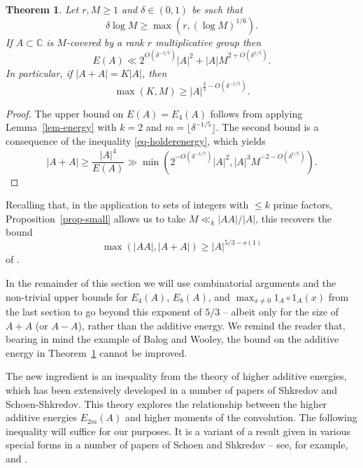\documentclass{amsart}
\renewcommand{\leq}{\leqslant}
\renewcommand{\geq}{\geqslant}
\newcommand{\bbc}{\mathbb{C}}
\newcommand{\abs}[1]{\left\lvert #1\right\rvert}
\newcommand{\brac}[1]{\left( #1\right)}
\newtheorem{theorem}{Theorem}
\theoremstyle{definition}
\begin{document}
\begin{theorem}\label{th-olden}
Let $r,M\geq 1$ and $\delta\in (0,1)$ be such that
\[\delta \log M \geq \max(r, (\log M)^{1/6}).\]
If $A\subset \bbc$ is $M$-covered by a rank $r$ multiplicative group then
\[E(A)\ll 2^{O(\delta^{-1/5})}\abs{A}^2+\abs{A}M^{2+O(\delta^{1/5})}.\]
In particular, if $\abs{A+A}=K\abs{A}$, then
\[\max(K,M)\geq \abs{A}^{\frac{2}{3}-O(\delta^{-1/5})}.\]
\end{theorem}
\begin{proof}
The upper bound on $E(A)=E_4(A)$ follows from applying Lemma~\ref{lem-energy} with $k=2$ and $m=\lfloor \delta^{-1/5}\rfloor$. The second bound is a consequence of the inequality \eqref{eq-holderenergy}, which yields
\[\abs{A+A}\geq \frac{\abs{A}^4}{E(A)}\gg \min\brac{  2^{-O(\delta^{-1/5})}\abs{A}^2, \abs{A}^{3}M^{-2-O(\delta^{1/5})}}.\]
\end{proof}

Recalling that, in the application to sets of integers with $\leq k$ prime factors, Proposition~\ref{prop-small} allows us to take $M\ll_k \abs{AA}/\abs{A}$, this recovers the bound
\[\max(\abs{AA},\abs{A+A})\geq \abs{A}^{5/3-o(1)}\]
of \cite{HRSZ25}.

In the remainder of this section we will use combinatorial arguments and the non-trivial upper bounds for $E_4(A)$, $E_8(A)$, and $\max_{x\neq 0}1_A\circ 1_A(x)$ from the last section to go beyond this exponent of $5/3$ -- albeit only for the size of $A+A$ (or $A-A$), rather than the additive energy. We remind the reader that, bearing in mind the example of Balog and Wooley, the bound on the additive energy in Theorem~\ref{th-olden} cannot be improved.


The new ingredient is an inequality from the theory of higher additive energies, which has been extensively developed in a number of papers of Shkredov and Schoen-Shkredov. This theory explores the relationship between the higher additive energies $E_{2m}(A)$ and higher moments of the convolution. The following inequality will suffice for our purposes. It is a variant of a result given in various special forms in a number of papers of Schoen and Shkredov -- see, for example, \cite[Remark 40]{Sh26} and \cite[Lemma 3]{ScSh13}. 
\end{document}
